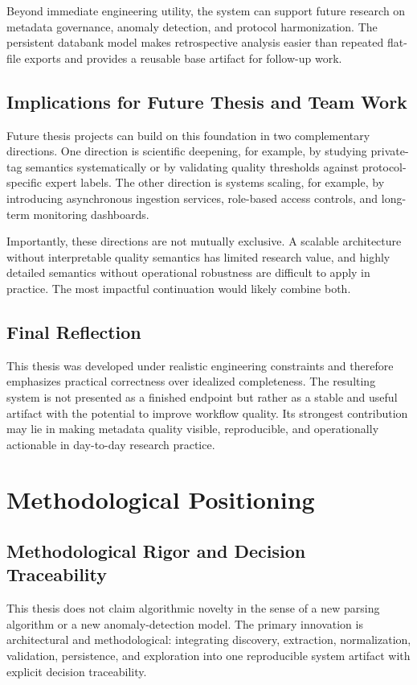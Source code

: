 Beyond immediate engineering utility, the system can support future research on metadata governance, anomaly detection, and protocol harmonization. The persistent databank model makes retrospective analysis easier than repeated flat-file exports and provides a reusable base artifact for follow-up work.

\subsection{Implications for Future Thesis and Team Work}
Future thesis projects can build on this foundation in two complementary directions. One direction is scientific deepening, for example, by studying private-tag semantics systematically or by validating quality thresholds against protocol-specific expert labels. The other direction is systems scaling, for example, by introducing asynchronous ingestion services, role-based access controls, and long-term monitoring dashboards.

Importantly, these directions are not mutually exclusive. A scalable architecture without interpretable quality semantics has limited research value, and highly detailed semantics without operational robustness are difficult to apply in practice. The most impactful continuation would likely combine both.

\subsection{Final Reflection}
This thesis was developed under realistic engineering constraints and therefore emphasizes practical correctness over idealized completeness. The resulting system is not presented as a finished endpoint but rather as a stable and useful artifact with the potential to improve workflow quality. Its strongest contribution may lie in making metadata quality visible, reproducible, and operationally actionable in day-to-day research practice.

\section{Methodological Positioning}
\subsection{Methodological Rigor and Decision Traceability}
This thesis does not claim algorithmic novelty in the sense of a new parsing algorithm or a new anomaly-detection model. The primary innovation is architectural and methodological: integrating discovery, extraction, normalization, validation, persistence, and exploration into one reproducible system artifact with explicit decision traceability.

